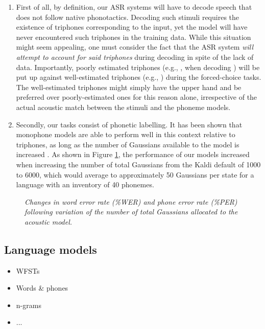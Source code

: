 \begin{enumerate}
\item First of all, by definition, our ASR systems will have to decode speech that does not follow native phonotactics. Decoding such stimuli requires the existence of triphones corresponding to the input, yet the model will have never encountered such triphones in the training data. While this situation might seem appealing, one must consider the fact that the ASR system \textit{will attempt to account for said triphones} during decoding in spite of the lack of data. Importantly, poorly estimated triphones (e.g., , when decoding ) will be put up against well-estimated triphones (e.g., ) during the forced-choice tasks. The well-estimated triphones might simply have the upper hand and be preferred over poorly-estimated ones for this reason alone, irrespective of the actual acoustic match between the stimuli and the phoneme models.
  \item Secondly, our tasks consist of phonetic labelling. It has been shown that monophone models are able to perform well in this context relative to triphones, as long as the number of Gaussians available to the model is increased {\color{red}\cite{saraclar2001}}. As shown in Figure \ref{fig:hmm_gaussians}, the performance of our models increased when increasing the number of total Gaussians from the Kaldi default of 1000 to 6000, which would average to approximately 50 Gaussians per state for a language with an inventory of 40 phonemes.   
\end{enumerate}

\begin{figure}[htb]
\centering
\caption{{\color{red}\textit{Changes in word error rate (\%WER) and phone error rate (\%PER) following variation of the number of total Gaussians allocated to the acoustic model.}}}
\label{fig:hmm_gaussians}
\end{figure}

\subsection{Language models}
\begin{itemize}
\item WFSTs
\item Words \& phones 
\item n-grams
\item ...
\end{itemize}

